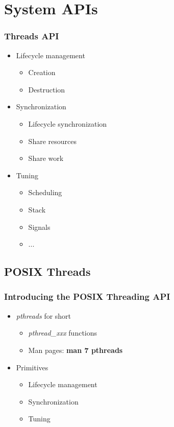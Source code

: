 \section{System APIs}



\begin{frame}
  \frametitle{Threads API}

  \begin{itemize}
  \item Lifecycle management
    \begin{itemize}
    \item Creation
    \item Destruction
    \end{itemize}
  \item Synchronization
    \begin{itemize}
    \item Lifecycle synchronization
    \item Share resources
    \item Share work
    \end{itemize}
  \item Tuning
    \begin{itemize}
    \item Scheduling
    \item Stack
    \item Signals
    \item ...
    \end{itemize}
  \end{itemize}
\end{frame}









\subsection{POSIX Threads}
\label{subsec:pthreads}



\begin{frame}
  \frametitle{Introducing the POSIX Threading API}

  \begin{itemize}
  \item \emph{pthreads} for short
    \begin{itemize}
    \item \emph{pthread\_xxx} functions
    \item Man pages: \textbf{man 7 pthreads}
    \end{itemize}
  \item Primitives
    \begin{itemize}
    \item Lifecycle management
    \item Synchronization
    \item Tuning
    \end{itemize}
  \end{itemize}
\end{frame}

